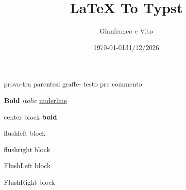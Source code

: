\documentclass{article}
\title{LaTeX To Typst}
\author{Gianfranco e Vito}
\date{\today}
\date{31/12/2026}
\begin{document}
    \maketitle
    \tableofcontents

    prova{-tra parentesi graffe-}
    testo pre commento %

    \textbf{Bold}
    \textit{italic}
    \underline{underline}

    \centering
    \raggedright
    \raggedleft
    \flushright
    \flushleft
    \usepackage{ragged2e}
    \begin{center}
        center block \textbf{bold}
    \end{center}
    \begin{flushleft} flushleft block \end{flushleft}
    \begin{flushright} flushright block \end{flushright}
    \begin{FlushLeft} FlushLeft block \end{FlushLeft}
    \begin{FlushRight} FlushRight block \end{FlushRight}

    \\
    \newline
    \break
    \hfill
    \vfill
    \pagebreak
    \newpage
    \clearpage
\end{document}
